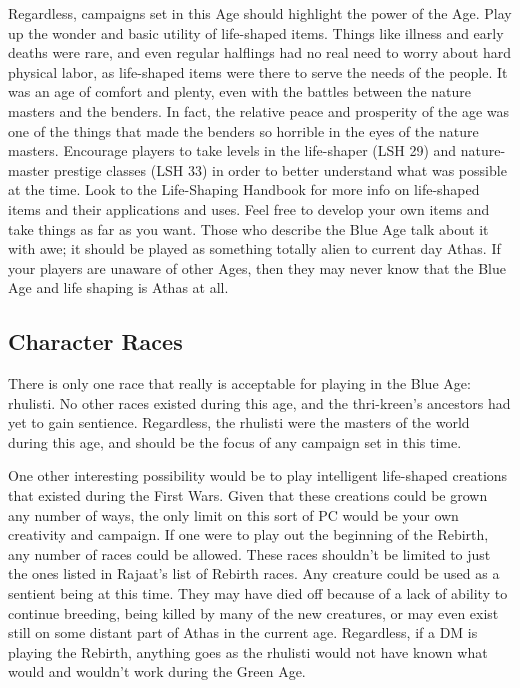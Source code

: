 Regardless, campaigns set in this Age should highlight the power of the Age. Play up the wonder and basic utility of life-shaped items. Things like illness and early deaths were rare, and even regular halflings had no real need to worry about hard physical labor, as life-shaped items were there to serve the needs of the people. It was an age of comfort and plenty, even with the battles between the nature masters and the benders. In fact, the relative peace and prosperity of the age was one of the things that made the benders so horrible in the eyes of the nature masters. Encourage players to take levels in the life-shaper (LSH 29) and nature-master prestige classes (LSH 33) in order to better understand what was possible at the time. Look to the Life-Shaping Handbook for more info on life-shaped items and their applications and uses. Feel free to develop your own items and take things as far as you want. Those who describe the Blue Age talk about it with awe; it should be played as something totally alien to current day Athas. If your players are unaware of other Ages, then they may never know that the Blue Age and life shaping is Athas at all.

\subsection{Character Races}
There is only one race that really is acceptable for playing in the Blue Age: rhulisti. No other races existed during this age, and the thri-kreen's ancestors had yet to gain sentience. Regardless, the rhulisti were the masters of the world during this age, and should be the focus of any campaign set in this time.

One other interesting possibility would be to play intelligent life-shaped creations that existed during the First Wars. Given that these creations could be grown any number of ways, the only limit on this sort of PC would be your own creativity and campaign. If one were to play out the beginning of the Rebirth, any number of races could be allowed. These races shouldn't be limited to just the ones listed in Rajaat's list of Rebirth races. Any creature could be used as a sentient being at this time. They may have died off because of a lack of ability to continue breeding, being killed by many of the new creatures, or may even exist still on some distant part of Athas in the current age. Regardless, if a DM is playing the Rebirth, anything goes as the rhulisti would not have known what would and wouldn't work during the Green Age.

